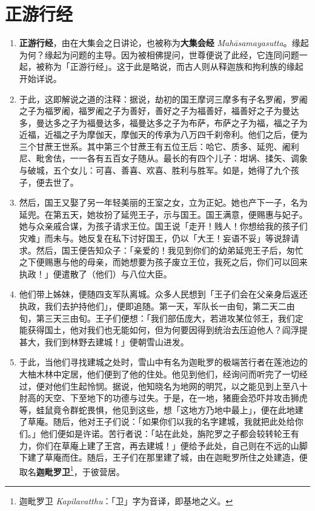 \section{正游行经}

\begin{enumerate}\item \textbf{正游行经}，由在大集会之日讲论，也被称为\textbf{大集会经} \textit{Mahāsamayasutta}。缘起为何？缘起为问题的主导。因为被相佛提问，世尊便说了此经，它连同问题一起，被称为「正游行经」。这于此是略说，而古人则从释迦族和拘利族的缘起开始详说。
\item 于此，这即解说之道的注释：据说，劫初的国王摩诃三摩多有子名罗阇，罗阇之子为福罗阇，福罗阇之子为善好，善好之子为福善好，福善好之子为曼达多，曼达多之子为福曼达多，福曼达多之子为布萨，布萨之子为福，福之子为近福，近福之子为摩伽天，摩伽天的传承为八万四千刹帝利。他们之后，便为三个甘蔗王世系。其中第三个甘蔗王有五位王后：哈它、质多、延兜、阇利尼、毗舍佉，一一各有五百女子随从。最长的有四个儿子：坩埚、揉矢、调象与破城，五个女儿：可喜、善喜、欢喜、胜利与胜军。如是，她得了九个孩子，便去世了。
\item 然后，国王又娶了另一年轻美丽的王室之女，立为正妃。她也产下一子，名为延兜。在第五天，她妆扮了延兜王子，示与国王。国王满意，便赐惠与妃子。她与众亲戚合谋，为孩子请求王位。国王说「走开！贱人！你想给我的孩子们灾难」而未与。她反复在私下讨好国王，仍以「大王！妄语不妥」等说辞请求。然后，国王便告知众子：「亲爱的！我见到你们的幼弟延兜王子后，匆忙之下便赐惠与他的母亲，而她想要为孩子废立王位，我死之后，你们可以回来执政！」便遣散了（他们）与八位大臣。
\item 他们带上姊妹，便随四支军队离城。众多人民想到「王子们会在父亲身后返还执政，我们去护持他们」，便即追随。第一天，军队长一由旬，第二天二由旬，第三天三由旬。王子们便想：「我们部伍庞大，若进攻某位邻王，我们定能获得国土，他对我们也无能如何，但为何要因得到统治去压迫他人？阎浮提甚大，我们到林野去建城！」便朝雪山进发。
\item 于此，当他们寻找建城之处时，雪山中有名为迦毗罗的极端苦行者在莲池边的大柚木林中定居，他们便到了他的住处。他见到他们，经询问而听完了一切经过，便对他们生起怜悯。据说，他知晓名为地网的明咒，以之能见到上至八十肘高的天空、下至地下的功德与过失。于是，在一地，猪鹿会恐吓并攻击狮虎等，蛙鼠竟令群蛇畏惧，他见到这些，想「这地方乃地中最上」，便在此地建了草庵。随后，他对王子们说：「如果你们以我的名字建城，我就把此处给你们。」他们便如是许诺。苦行者说：「站在此处，旃陀罗之子都会较转轮王有力，你们在草庵上建了王宫，再去建城！」便给予此处，自己则在不远的山脚下建了草庵而住。随后，王子们在那里建了城，由在迦毗罗所住之处建造，便取名\textbf{迦毗罗卫}\footnote{迦毗罗卫 \textit{Kapilavatthu}：「卫」字为音译，即基地之义。}，于彼营居。

\end{enumerate}
